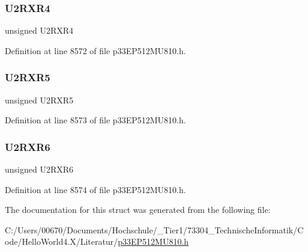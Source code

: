 \subsubsection{\texorpdfstring{U2\+R\+X\+R4}{U2RXR4}}
{\footnotesize\ttfamily unsigned U2\+R\+X\+R4}



Definition at line 8572 of file p33\+E\+P512\+M\+U810.\+h.

\mbox{\label{structtag_r_p_i_n_r19_b_i_t_s_ac294463c8df79a6517df436ab9a0857b}} 
\subsubsection{\texorpdfstring{U2\+R\+X\+R5}{U2RXR5}}
{\footnotesize\ttfamily unsigned U2\+R\+X\+R5}



Definition at line 8573 of file p33\+E\+P512\+M\+U810.\+h.

\mbox{\label{structtag_r_p_i_n_r19_b_i_t_s_a4e7eca3f0bcb416ff645f151381ea171}} 
\subsubsection{\texorpdfstring{U2\+R\+X\+R6}{U2RXR6}}
{\footnotesize\ttfamily unsigned U2\+R\+X\+R6}



Definition at line 8574 of file p33\+E\+P512\+M\+U810.\+h.



The documentation for this struct was generated from the following file\+:\begin{DoxyCompactItemize}
\item 
C\+:/\+Users/00670/\+Documents/\+Hochschule/\+\_\+\+Tier1/73304\+\_\+\+Technische\+Informatik/\+Code/\+Hello\+World4.\+X/\+Literatur/\hyperlink{p33_e_p512_m_u810_8h}{p33\+E\+P512\+M\+U810.\+h}\end{DoxyCompactItemize}
